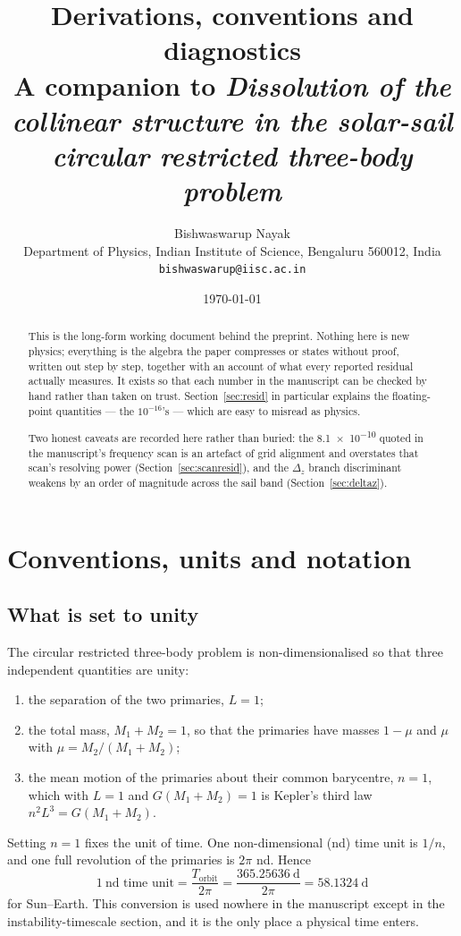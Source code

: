 \documentclass[11pt,a4paper]{article}
\title{\bfseries Derivations, conventions and diagnostics\\
\large A companion to \emph{Dissolution of the collinear structure in the
solar-sail circular restricted three-body problem}}
\author{Bishwaswarup Nayak\\[2pt]
\small Department of Physics, Indian Institute of Science, Bengaluru 560012, India\\
\small\texttt{bishwaswarup@iisc.ac.in}}
\date{\today}
\begin{document}
\maketitle

\begin{abstract}
\noindent
This is the long-form working document behind the preprint. Nothing here is new
physics; everything is the algebra the paper compresses or states without proof,
written out step by step, together with an account of what every reported
residual actually measures. It exists so that each number in the manuscript can
be checked by hand rather than taken on trust. Section~\ref{sec:resid} in
particular explains the floating-point quantities --- the $10^{-16}$'s --- which
are easy to misread as physics.

Two honest caveats are recorded here rather than buried: the
\num{8.1e-10} quoted in the manuscript's frequency scan is an artefact of grid
alignment and overstates that scan's resolving power
(Section~\ref{sec:scanresid}), and the $\Delta_z$ branch discriminant weakens by
an order of magnitude across the sail band (Section~\ref{sec:deltaz}).
\end{abstract}

\tableofcontents

\section{Conventions, units and notation}\label{sec:conv}

\subsection{What is set to unity}

The circular restricted three-body problem is non-dimensionalised so that three
independent quantities are unity:
\begin{enumerate}
\item the separation of the two primaries, $L=1$;
\item the total mass, $M_1+M_2=1$, so that the primaries have masses $1-\mu$
      and $\mu$ with $\mu=M_2/(M_1+M_2)$;
\item the mean motion of the primaries about their common barycentre, $n=1$,
      which with $L=1$ and $G(M_1+M_2)=1$ is Kepler's third law
      $n^2L^3=G(M_1+M_2)$.
\end{enumerate}
Setting $n=1$ fixes the unit of time. One non-dimensional (nd) time unit is
$1/n$, and one full revolution of the primaries is $2\pi$ nd. Hence
\begin{equation}
  1\ \text{nd time unit} = \frac{T_{\mathrm{orbit}}}{2\pi}
  = \frac{\SI{365.25636}{\day}}{2\pi} = \SI{58.1324}{\day}
  \label{eq:timeunit}
\end{equation}
for Sun--Earth. This conversion is used nowhere in the manuscript except in the
instability-timescale section, and it is the only place a physical time enters.
\end{document}
